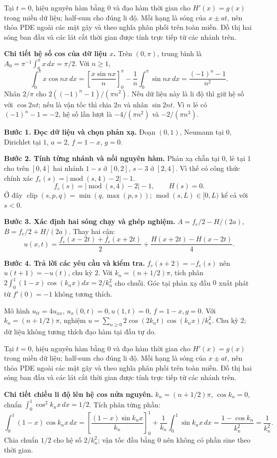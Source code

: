 Tại $t=0$, hiệu nguyên hàm bằng $0$ và đạo hàm thời gian cho $H'(x)=g(x)$ trong miền dữ liệu; half-sum cho đúng li độ. Mỗi hạng là sóng của $x\pm at$, nên thỏa PDE ngoài các mặt gãy và theo nghĩa phân phối trên toàn miền. Đồ thị hai sóng ban đầu và các lát cắt thời gian được tính trực tiếp từ các nhánh trên.

\textbf{Chi tiết hệ số cos của dữ liệu $x$.} Trên $(0,\pi)$, trung bình là $A_0=\pi^{-1}\int_0^\pi x\,dx=\pi/2$. Với $n\ge1$,
\[\int_0^\pi x\cos nx\,dx=\left[\frac{x\sin nx}{n}\right]_0^\pi-\frac1n\int_0^\pi\sin nx\,dx
=\frac{(-1)^n-1}{n^2}.\]
Nhân $2/\pi$ cho $2((-1)^n-1)/(\pi n^2)$. Nếu dữ liệu này là li độ thì giữ hệ số với $\cos2nt$; nếu là vận tốc thì chia $2n$ và nhân $\sin2nt$. Vì $n$ lẻ có $(-1)^n-1=-2$, hệ số lần lượt là $-4/(\pi n^2)$ và $-2/(\pi n^3)$.

\textbf{Bước 1. Đọc dữ liệu và chọn phản xạ.} Đoạn $(0,1)$, Neumann tại $0$, Dirichlet tại $1$, $a=2$, $f=1-x$, $g=0$.

\textbf{Bước 2. Tính từng nhánh và nối nguyên hàm.} Phản xạ chẵn tại $0$, lẻ tại $1$ cho trên $[0,4]$ hai nhánh $1-s$ ở $[0,2]$, $s-3$ ở $[2,4]$. Vì thế có công thức chính xác $f_e(s)=|\operatorname{mod}(s,4)-2|-1$.
\[f_e(s)=|\operatorname{mod}(s,4)-2|-1,\qquad H(s)=0.\]
Ở đây $\operatorname{clip}(s,p,q)=\min(q,\max(p,s))$; $\operatorname{mod}(s,L)\in[0,L)$ kể cả với $s<0$.

\textbf{Bước 3. Xác định hai sóng chạy và ghép nghiệm.} $A=f_e/2-H/(2a)$, $B=f_e/2+H/(2a)$. Thay hai cận:
\[u(x,t)=\frac{f_e(x-2t)+f_e(x+2t)}2+\frac{H(x+2t)-H(x-2t)}{4}.\]

\textbf{Bước 4. Trả lời các yêu cầu và kiểm tra.} $f_e(s+2)=-f_e(s)$ nên $u(t+1)=-u(t)$, chu kỳ $2$. Với $k_n=(n+1/2)\pi$, tích phân $2\int_0^1(1-x)\cos(k_nx)dx=2/k_n^2$ cho chuỗi. Góc tại phản xạ đầu $0$ xuất phát từ $f'(0)=-1$ không tương thích.

Mô hình $u_{tt}=4u_{xx}$, $u_x(0,t)=0,u(1,t)=0$, $f=1-x,g=0$. Với $k_n=(n+1/2)\pi$, nghiệm $u=\sum_{n\ge0}2\cos(2k_nt)\cos(k_nx)/k_n^2$. Chu kỳ 2; dữ liệu không tương thích đạo hàm tại đầu tự do.

Tại $t=0$, hiệu nguyên hàm bằng $0$ và đạo hàm thời gian cho $H'(x)=g(x)$ trong miền dữ liệu; half-sum cho đúng li độ. Mỗi hạng là sóng của $x\pm at$, nên thỏa PDE ngoài các mặt gãy và theo nghĩa phân phối trên toàn miền. Đồ thị hai sóng ban đầu và các lát cắt thời gian được tính trực tiếp từ các nhánh trên.

\textbf{Chi tiết chiếu li độ lên hệ cos nửa nguyên.} $k_n=(n+1/2)\pi$, $\cos k_n=0$, chuẩn $\int_0^1\cos^2k_nx\,dx=1/2$. Tích phân từng phần:
\[\int_0^1(1-x)\cos k_nx\,dx=\left[\frac{(1-x)\sin k_nx}{k_n}\right]_0^1+\frac1{k_n}\int_0^1\sin k_nx\,dx
=\frac{1-\cos k_n}{k_n^2}=\frac1{k_n^2}.\]
Chia chuẩn $1/2$ cho hệ số $2/k_n^2$; vận tốc đầu bằng $0$ nên không có phần sine theo thời gian.

